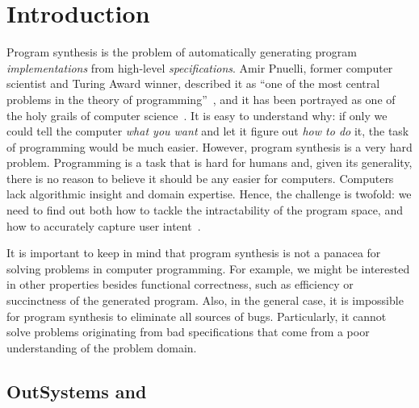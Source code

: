 \section{Introduction}
\label{sec:introduction}

Program synthesis is the problem of automatically generating program
\textit{implementations} from high-level \textit{specifications}.
Amir Pnuelli, former computer scientist and Turing Award winner, described it as
``one of the most central problems in the theory of
programming''~\cite{Pnueli:1989:ARM}, and it has been portrayed as one of the
holy grails of computer science~\cite{Solar-Lezama:2008,Gulwani2017}.
It is easy to understand why: if only we could tell the computer \textit{what you
want} and let it figure out \textit{how to do} it, the task of programming would
be much easier.
However, program synthesis is a very hard problem.
Programming is a task that is hard for humans and, given its generality,
there is no reason to believe it should be any easier for computers.
Computers lack algorithmic insight and domain expertise.
Hence, the challenge is twofold: we need to find out both how to tackle the
intractability of the program space, and how to accurately capture user
intent~\cite{Gulwani2017}.

It is important to keep in mind that program synthesis is not a panacea for
solving problems in computer programming.
For example, we might be interested in other properties besides functional
correctness, such as efficiency or succinctness of the generated program.
Also, in the general case, it is impossible for program synthesis to eliminate
all sources of bugs.
Particularly, it cannot solve problems originating from bad specifications
that come from a poor understanding of the problem domain.

\subsection{OutSystems and }
\label{sec:outsystems-pbe}

